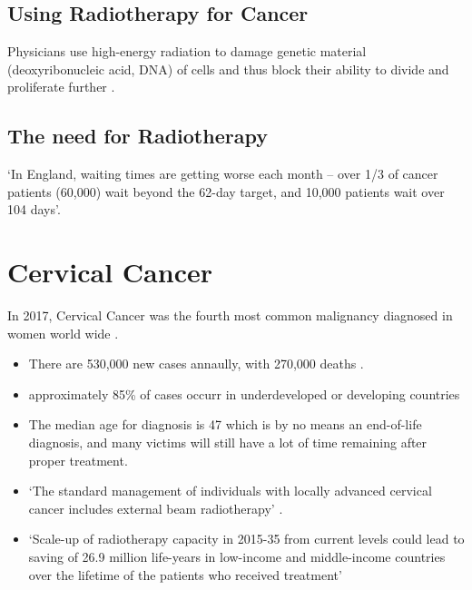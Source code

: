 \documentclass[11pt]{article}
\begin{document}
\subsection{Using Radiotherapy for Cancer}

Physicians use high-energy radiation to damage genetic material (deoxyribonucleic acid, DNA) of cells and thus block their ability to divide and proliferate further \cite{radiotherapy-advances}.

\subsection{The need for Radiotherapy}


`In England, waiting times are getting worse each month – over 1/3 of cancer patients (60,000) wait beyond the 62-day target, and 10,000 patients wait over 104 days'.
 
\section{Cervical Cancer}

In 2017, Cervical Cancer was the fourth most common malignancy diagnosed in women world wide \cite{cervical-cancer-epidemic}.

\begin{itemize}
    \item There are 530,000 new cases annaully, with 270,000 deaths \cite{cervical-cancer-epidemic}.
    \item approximately 85\% of cases occurr in underdeveloped or developing countries \cite{cervical-cancer-epidemic}
    \item The median age for diagnosis is 47 \cite{cervical-cancer-epidemic} which is by no means an end-of-life diagnosis, and many victims will still have a lot of time remaining after proper treatment.
    \item `The standard management of individuals with locally advanced cervical cancer includes external beam radiotherapy' \cite{cervical-cancer-epidemic}.
    \item `Scale-up of radiotherapy capacity in 2015-35 from current levels could lead to saving of 26.9 million life-years in low-income and middle-income countries over the lifetime of the patients who received treatment' \cite{expanding-global-access-to-radiotherapy}
\end{itemize}

\printbibliography
\end{document}
